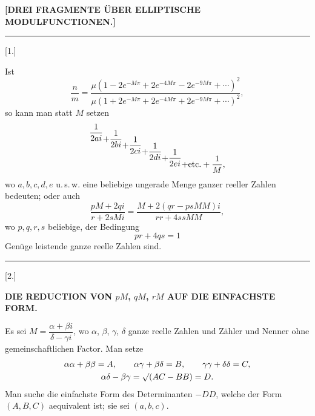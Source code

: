 \begin{center}\textbf{[DREI FRAGMENTE ÜBER ELLIPTISCHE MODULFUNCTIONEN.]}\end{center}
\begin{center}\rule{1.5cm}{.4pt}\end{center}
\begin{center}[1.]\end{center}

Ist
\[
\frac{n}{m}=\frac{\mu(1-2e^{-M\pi}+2e^{-4M\pi}-2e^{-9M\pi}+\cdots)^2}{\mu(1+2e^{-M\pi}+2e^{-4M\pi}+2e^{-9M\pi}+\cdots)^2},
\]
so kann man statt $M$ setzen
\[
\frac{1}{2ai}\StepDown{.75}{+\frac{1}{2bi}}\StepDown{1.5}{+\frac{1}{2ci}}\StepDown{2.25}{+\frac{1}{2di}}\StepDown{3}{+\frac{1}{2ei}}\StepDown{3.75}{+\text{etc.}+\frac{1}{M},}
\]
wo $a,b,c,d,e$ u.\,s.\,w. eine beliebige ungerade Menge ganzer reeller Zahlen bedeuten; oder auch
\[
\frac{pM+2qi}{r+2sMi}=\frac{M+2(qr-psMM)i}{rr+4ssMM},
\]
wo $p,q,r,s$ beliebige, der Bedingung
\[
pr+4qs=1
\]
Genüge leistende ganze reelle Zahlen sind.

\begin{center}\rule{3cm}{.4pt}\end{center}
\begin{center}[2.]\end{center}
\begin{center}\textbf{DIE REDUCTION VON $pM$, $qM$, $rM$ AUF DIE EINFACHSTE FORM.}\end{center}

Es sei $M=\dfrac{\alpha+\beta i}{\delta-\gamma i}$, wo $\alpha$, $\beta$, $\gamma$, $\delta$ ganze reelle Zahlen und Zähler und Nenner ohne gemeinschaftlichen Factor. Man setze
\[
\begin{gathered}
\alpha\alpha+\beta\beta=A,\qquad \alpha\gamma+\beta\delta=B,\qquad \gamma\gamma+\delta\delta=C,\\
\alpha\delta-\beta\gamma=\mathord{\surd}(AC-BB)=D.
\end{gathered}
\]
Man suche die einfachste Form des Determinanten $-DD$, welche der Form $(A,B,C)$ aequivalent ist; sie sei $(a,b,c)$.

